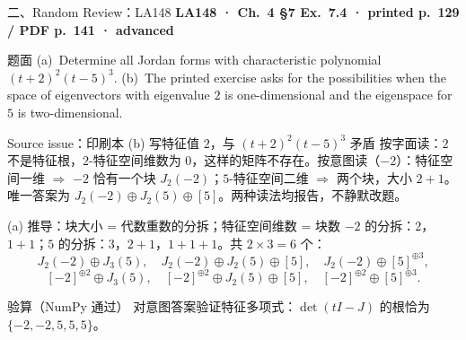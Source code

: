 \documentclass[aspectratio=169,10pt,fontset=none]{ctexbeamer}
\newcommand{\ex}[1]{\textcolor{accent}{\footnotesize\bfseries #1}}
\begin{document}
\begin{frame}[t]{二、Random Review：LA148}
  \leavevmode\ex{LA148 · Ch.~4 §7 Ex.~7.4 · printed p.~129 / PDF p.~141 · advanced}
  \begin{block}{\footnotesize 题面}
    \scriptsize (a)~Determine all Jordan forms with characteristic polynomial $(t+2)^2(t-5)^3$. (b)~The printed exercise asks for the possibilities when the space of eigenvectors with eigenvalue $2$ is one-dimensional and the eigenspace for $5$ is two-dimensional.
  \end{block}
  \begin{alertblock}{\footnotesize Source issue：印刷本 (b) 写特征值 $2$，与 $(t+2)^2(t-5)^3$ 矛盾}
    \scriptsize 按字面读：$2$ 不是特征根，$2$-特征空间维数为 $0$，这样的矩阵不存在。按意图读（$-2$）：特征空间一维 $\Rightarrow$ $-2$ 恰有一个块 $J_2(-2)$；$5$-特征空间二维 $\Rightarrow$ 两个块，大小 $2+1$。唯一答案为 $J_2(-2)\oplus J_2(5)\oplus[5]$。两种读法均报告，不静默改题。
  \end{alertblock}
  \begin{exampleblock}{\footnotesize (a) 推导：块大小 = 代数重数的分拆；特征空间维数 = 块数}
    \scriptsize
    $-2$ 的分拆：$2$，$1+1$；$5$ 的分拆：$3$，$2+1$，$1+1+1$。共 $2\times3=6$ 个：
    $$J_2(-2)\oplus J_3(5),\quad J_2(-2)\oplus J_2(5)\oplus[5],\quad J_2(-2)\oplus[5]^{\oplus3},$$
    $$[-2]^{\oplus2}\oplus J_3(5),\quad [-2]^{\oplus2}\oplus J_2(5)\oplus[5],\quad [-2]^{\oplus2}\oplus[5]^{\oplus3}.$$
  \end{exampleblock}
  \begin{block}{\footnotesize 验算（NumPy 通过）}
    \scriptsize 对意图答案验证特征多项式：$\det(tI-J)$ 的根恰为 $\{-2,-2,5,5,5\}$。
  \end{block}
\end{frame}
\end{document}
